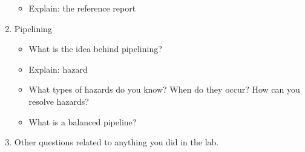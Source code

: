 \begin{enumerate}
\begin{itemize}
			\item Explain: the reference report
			\end{itemize}
		\item Pipelining
			\begin{itemize}			
			\item What is the idea behind pipelining?
			\item Explain: hazard
			\item What types of hazards do you know? When do they occur? How can you resolve hazards?
			\item What is a balanced pipeline?
			\end{itemize}
		\item Other questions related to anything you did in the lab.
\end{enumerate}

